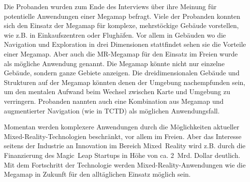 Die Probanden wurden zum Ende des Interviews über ihre Meinung für potentielle Anwendungen einer Megamap befragt.
Viele der Probanden konnten sich den Einsatz der Megamap für komplexe, mehrstöckige Gebäude vorstellen, wie z.B. in Einkaufszentren oder Flughäfen.
Vor allem in Gebäuden wo die Navigation und Exploration in drei Dimensionen stattfindet sehen sie die Vorteile einer Megamap.
Aber auch die MR-Megamap für den Einsatz im Freien wurde als mögliche Anwendung genannt.
Die Megamap könnte nicht nur einzelne Gebäude, sondern ganze Gebiete anzeigen.
Die dreidimensionalen Gebäude und Strukturen auf der Megamap könnten denen der Umgebung nachempfunden sein, um den mentalen Aufwand beim Wechsel zwischen Karte und Umgebung zu verringern.
Probanden nannten auch eine Kombination aus Megamap und augmentierter Navigation (wie in TCTD) als möglichen Anwendungsfall.

Momentan werden komplexere Anwendungen durch die Möglichkeiten aktueller Mixed-Reality-Technologien beschränkt, vor allem im Freien.
Aber das Interesse seitens der Industrie an Innovation im Bereich Mixed~Reality wird z.B. durch die Finanzierung des Magic~Leap Startups in Höhe von ca. 2~Mrd. Dollar \parencite{Machkovech2017} deutlich.
Mit dem Fortschritt der Technologie werden Mixed-Reality-Anwendungen wie die Megamap in Zukunft für den alltäglichen Einsatz möglich sein.


%
\cleardoublepage
